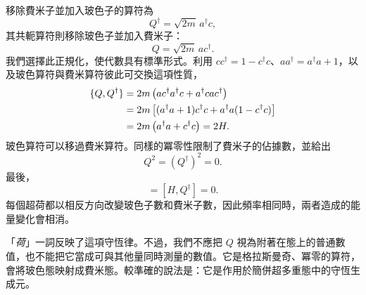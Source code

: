 移除費米子並加入玻色子的算符為
\begin{equation}
Q^\dagger=\sqrt{2m}\,a^\dagger c,
\end{equation}
其共軛算符則移除玻色子並加入費米子：
\begin{equation}
Q=\sqrt{2m}\,a c^\dagger.
\end{equation}
我們選擇此正規化，使代數具有標準形式。利用 \(cc^\dagger=1-c^\dagger c\)、\(aa^\dagger=a^\dagger a+1\)，以及玻色算符與費米算符彼此可交換這項性質，
\begin{align}
\{Q,Q^\dagger\}
&=2m\left(ac^\dagger a^\dagger c+a^\dagger c a c^\dagger\right)\notag\\
&=2m\left[(a^\dagger a+1)c^\dagger c
+a^\dagger a(1-c^\dagger c)\right]\notag\\
&=2m\left(a^\dagger a+c^\dagger c\right)=2H.
\label{eq:l7-superalgebra}
\end{align}
玻色算符可以移過費米算符。同樣的冪零性限制了費米子的佔據數，並給出
\begin{equation}
Q^2=(Q^\dagger)^2=0.
\end{equation}
最後，
\begin{equation}
[H,Q]=[H,Q^\dagger]=0.
\label{eq:l7-conserved-supercharges}
\end{equation}
每個超荷都以相反方向改變玻色子數和費米子數，因此頻率相同時，兩者造成的能量變化會相消。

\begin{classroomqa}
\end{classroomqa}

\begin{classroomqa}
\end{classroomqa}

「\emph{荷}」一詞反映了這項守恆律。不過，我們不應把 \(Q\) 視為附著在態上的普通數值，也不能把它當成可與其他量同時測量的數值。它是格拉斯曼奇、冪零的算符，會將玻色態映射成費米態。較準確的說法是：它是作用於簡併超多重態中的守恆生成元。

